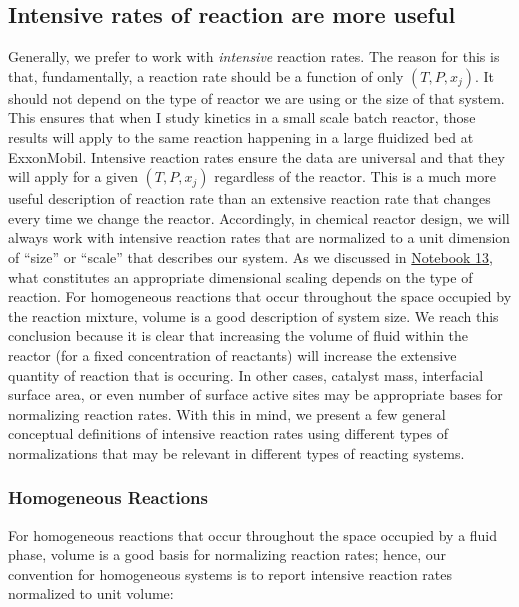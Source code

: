 \documentclass[11pt]{article}
\begin{document}
\hypertarget{intensive-rates-of-reaction-are-more-useful}{%
\subsection{Intensive rates of reaction are more
useful}\label{intensive-rates-of-reaction-are-more-useful}}

Generally, we prefer to work with \emph{intensive} reaction rates. The
reason for this is that, fundamentally, a reaction rate should be a
function of only \((T, P, x_j)\). It should not depend on the type of
reactor we are using or the size of that system. This ensures that when
I study kinetics in a small scale batch reactor, those results will
apply to the same reaction happening in a large fluidized bed at
ExxonMobil. Intensive reaction rates ensure the data are universal and
that they will apply for a given \((T, P, x_j)\) regardless of the
reactor. This is a much more useful description of reaction rate than an
extensive reaction rate that changes every time we change the reactor.
Accordingly, in chemical reactor design, we will always work with
intensive reaction rates that are normalized to a unit dimension of
``size'' or ``scale'' that describes our system. As we discussed in
\href{https://jqbond.github.io/CEN587/Notebooks/587-N13.html}{Notebook
13}, what constitutes an appropriate dimensional scaling depends on the
type of reaction. For homogeneous reactions that occur throughout the
space occupied by the reaction mixture, volume is a good description of
system size. We reach this conclusion because it is clear that
increasing the volume of fluid within the reactor (for a fixed
concentration of reactants) will increase the extensive quantity of
reaction that is occuring. In other cases, catalyst mass, interfacial
surface area, or even number of surface active sites may be appropriate
bases for normalizing reaction rates. With this in mind, we present a
few general conceptual definitions of intensive reaction rates using
different types of normalizations that may be relevant in different
types of reacting systems.

\hypertarget{homogeneous-reactions}{%
\subsubsection{Homogeneous Reactions}\label{homogeneous-reactions}}

For homogeneous reactions that occur throughout the space occupied by a
fluid phase, volume is a good basis for normalizing reaction rates;
hence, our convention for homogeneous systems is to report intensive
reaction rates normalized to unit volume:
\end{document}
